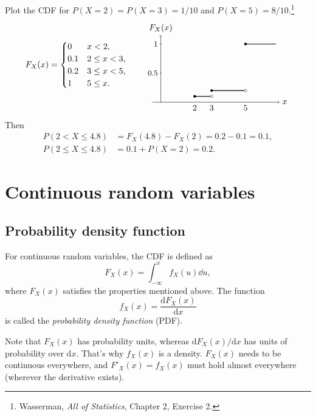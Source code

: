 \begin{exercise}
Plot the CDF for $P(X = 2) = P(X = 3) = 1/10$ and $P(X = 5) = 8/10$.\footnote{Wasserman, \emph{All of Statistics}, Chapter 2, Exercise 2.}
\[
F_X(x) =
\begin{cases}
0 & x < 2,\\
0.1 & 2 \le x < 3,\\
0.2 & 3 \le x < 5,\\
1 & 5 \le x.
\end{cases}
\qquad
\begin{tikzpicture}[baseline=(current bounding box.center),x=0.7cm,y=2.4cm]
\draw[->] (-0.5,0) -- (7,0) node[right] {$x$};
\draw[->] (0,0) -- (0,1.15) node[above] {$F_X(x)$};
\draw[thick] (2,0.1) -- (3,0.1); \fill (2,0.1) circle (1.5pt); \draw[fill=white] (3,0.1) circle (1.5pt);
\draw[thick] (3,0.2) -- (5,0.2); \fill (3,0.2) circle (1.5pt); \draw[fill=white] (5,0.2) circle (1.5pt);
\draw[thick] (5,1) -- (6.8,1); \fill (5,1) circle (1.5pt);
\foreach \x in {2,3,5} \node[below] at (\x,0) {\x};
\foreach \y in {0.5,1} {\draw (-0.05,\y) -- (0.05,\y); \node[left] at (0,\y) {\small $\y$};}
\end{tikzpicture}
\]
Then
\begin{align*}
P(2 < X \le 4.8) &= F_X(4.8) - F_X(2) = 0.2 - 0.1 = 0.1,\\
P(2 \le X \le 4.8) &= 0.1 + P(X = 2) = 0.2.
\end{align*}
\end{exercise}

\section{Continuous random variables}
\subsection{Probability density function}
For continuous random variables, the CDF is defined as
\[
F_X(x) = \int_{-\infty}^{x} f_X(u)\dd u,
\]
where $F_X(x)$ satisfies the properties mentioned above. The function
\[
f_X(x) = \frac{\mathrm{d}F_X(x)}{\mathrm{d}x}
\]
is called the \emph{probability density function} (PDF).

Note that $F_X(x)$ has probability units, whereas $\mathrm{d}F_X(x)/\mathrm{d}x$ has units of probability over $\mathrm{d}x$. That's why $f_X(x)$ is a density. $F_X(x)$ needs to be continuous everywhere, and $F'_X(x) = f_X(x)$ must hold almost everywhere (wherever the derivative exists).

